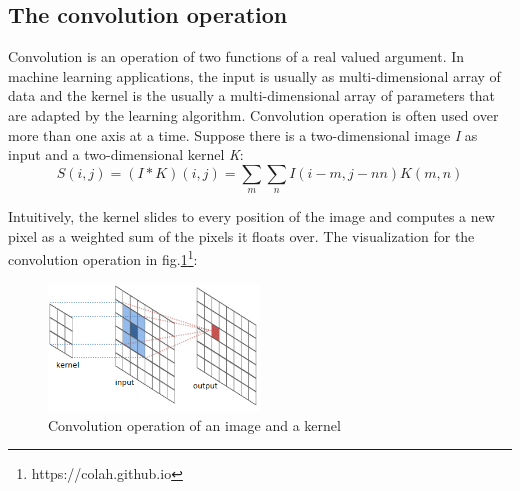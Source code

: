 \subsection{The convolution operation}
\hspace{0.45cm} Convolution is an operation of two functions of a real valued argument. 
In machine learning applications, the input is usually as multi-dimensional array of data 
and the kernel is the usually a multi-dimensional array of parameters that are adapted by the learning algorithm\cite{Goodfellow-et-al-2016}. 
Convolution operation is often used over more than one axis at a time. 
Suppose there is a two-dimensional image \textit{I} as input and a two-dimensional kernel \textit{K}:
\begin{equation}
    S(i,j) = (I*K)(i,j) = \underset{m}{\sum}\underset{n}{\sum}I(i-m,j-nn)K(m,n)
\end{equation}
\par
Intuitively, the kernel slides to every position of the image and computes a new pixel as a weighted sum of the pixels it floats over. The visualization for the convolution operation in fig.\ref{fig:conv}\footnote{https://colah.github.io}:\par
\begin{figure}[h!]
    \centering
    \includegraphics[width=0.5\textwidth]{Chapters/Fig/conv.png}
    \caption{Convolution operation of an image and a kernel}
    \label{fig:conv}
\end{figure}\par
